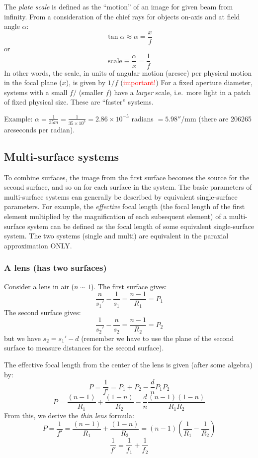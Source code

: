 \documentclass[12pt]{article}
\begin{document}
The \emph{plate scale} is defined as the
``motion'' of an image for given beam from infinity.
From a consideration of the chief rays
for objects on-axis and at field angle $\alpha$: {$$
    \tan{\alpha} \approx \alpha = \frac{x}{f}
$$} or {$$
    \textrm{scale} \equiv \frac{\alpha}{x} = \frac{1}{f}
$$}In other words, the scale, in units of angular motion (arcsec)
per physical motion in the focal plane ($x$), is given by $1/f$
(\textcolor{red}{important!})
For a fixed aperture
diameter, systems with a small $f/$ (smaller $f$) have
a \emph{larger} scale, i.e.\ more light in a patch of fixed physical size.
These are ``faster'' systems.

Example:
$\alpha = \frac{1}{35m} = \frac{1}{35\times10^3} = 2.86\times10^{-5}$
radians $ = 5.98''$/mm (there are 206265 arcseconds per radian).

\subsection{Multi-surface systems}
To combine surfaces, the image from the first surface becomes the
source for the second surface, and so on for each surface in the system.
The basic parameters of multi-surface systems can generally be described by
equivalent single-surface parameters.
For example, the \emph{effective} focal length
(the focal length of the first element multiplied by the magnification of
each subsequent element) of a multi-surface system
can be defined as the focal length of some
equivalent single-surface system.
The two systems (single and multi) are
equivalent in the paraxial approximation ONLY\@.

\subsubsection{A lens (has two surfaces)}
Consider a lens in air ($n \sim 1$). The first surface gives:{$$
    \frac{n}{s_{1}'}-\frac{1}{s_{1}} = \frac{n-1}{R_{1}}=P_{1}
$$}The second surface gives:{$$
    \frac{1}{s_{2}'}-\frac{n}{s_{2}} = \frac{n-1}{R_{2}}=P_{2}
$$}but we have $s_{2} = s_{1}'-d$ (remember we have to use the plane of the
second surface to measure distances for the second surface).

The effective focal length from the center of the lens
is given (after some algebra) by:{$$
    P=\frac{1}{f'}=P_{1}+P_{2}-\frac{d}{n}P_{1}P_{2} $$ $$
    P=\frac{(n-1)}{R_{1}}+\frac{(1-n)}{R_{2}}-\frac{d}{n}
    \frac{(n-1)(1-n)}{R_{1}R_{2}}
$$}From this, we derive the \emph{thin lens} formula:{$$
    P=\frac{1}{f'} = \frac{(n-1)}{R_{1}}+\frac{(1-n)}{R_{2}} =
    (n-1)\left( \frac{1}{R_1} - \frac{1}{R_2}\right)  $$ $$
    \frac{1}{f'} = \frac{1}{f_{1}} + \frac{1}{f_{2}}
$$}
\end{document}
